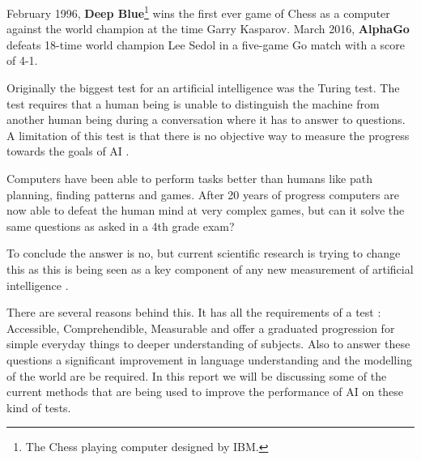 February 1996, \textbf{Deep Blue}\footnote{The Chess playing computer designed by IBM.} wins the first ever game of Chess as a computer against the world champion at the time Garry Kasparov.
March 2016, \textbf{AlphaGo} defeats 18-time world champion Lee Sedol in a five-game Go match with a score of 4-1.

Originally the biggest test for an artificial intelligence was the Turing test.
The test requires that a human being is unable to distinguish the machine from another human being during a conversation where it has to answer to questions.
A limitation of this test is that there is no objective way to measure the progress towards the goals of AI \cite{honorstudent}.

Computers have been able to perform tasks better than humans like path planning, finding patterns and games. After 20 years of progress computers are now able to defeat the human mind at very complex games, but can it solve the same questions as asked in a 4th grade exam?

To conclude the answer is no, but current scientific research is trying to change this as this is being seen as a key component of any new measurement of artificial intelligence \cite{honorstudent}.

There are several reasons behind this.
It has all the requirements of a test \cite{honorstudent}: Accessible, Comprehendible, Measurable and offer a graduated progression for simple everyday things to deeper understanding of subjects.
Also to answer these questions a significant improvement in language understanding and the modelling of the world are be required. In this report we will be discussing some of the current methods that are being used to improve the performance of AI on these kind of tests.